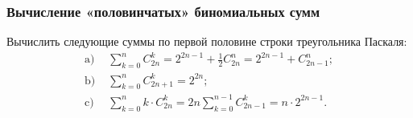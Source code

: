 \subsubsection{Вычисление «половинчатых» биномиальных сумм}

\begin{problem}
    Вычислить следующие суммы по первой половине строки треугольника 
    Паскаля:
    \begin{align}
        \text{a) } & \sum_{k=0}^{n} C_{2n}^k = 
        2^{2n-1} + \frac{1}{2} C_{2n}^n = 2^{2n-1} + C_{2n-1}^n; 
        \label{eq:half_sum_even} \tag{10} \\
        \text{b) } & \sum_{k=0}^{n} C_{2n+1}^k = 2^{2n}; 
        \label{eq:half_sum_odd} \tag{11} \\
        \text{c) } & \sum_{k=0}^{n} k \cdot C_{2n}^k = 
        2n \sum_{k=0}^{n-1} C_{2n-1}^k = n \cdot 2^{2n-1}. 
        \label{eq:half_sum_weighted} \tag{12}
    \end{align}
\end{problem}

